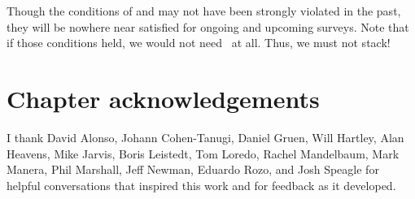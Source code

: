 Though the conditions of  and  may not have been strongly violated in the past, they will be nowhere near satisfied for ongoing and upcoming surveys.
Note that if those conditions held, we would not need \lsst\ at all.
Thus, we must not stack!

%

\section*{Chapter acknowledgements}

I thank David Alonso, Johann Cohen-Tanugi, Daniel Gruen, Will Hartley, Alan Heavens, Mike Jarvis, Boris Leistedt, Tom Loredo, Rachel Mandelbaum, Mark Manera, Phil Marshall, Jeff Newman, Eduardo Rozo, and Josh Speagle for helpful conversations that inspired this work and for feedback as it developed.